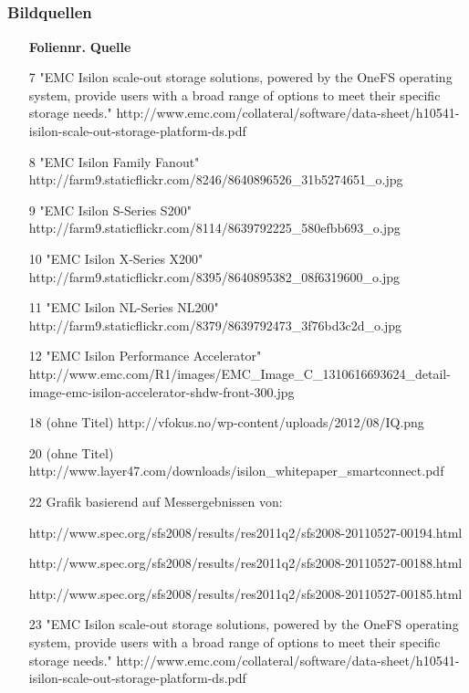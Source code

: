 \documentclass{beamer}
\begin{document}
\subsection{}
\begin{frame}[fragile]
  \frametitle{Bildquellen}

  \tiny
  \begin{itemize}
    \item[\textbf{Foliennr.}] \textbf{Quelle}
    \item[7] "EMC Isilon scale-out storage solutions, powered by the OneFS operating system, provide users with a broad range of options to meet their specific storage needs." http://www.emc.com/collateral/software/data-sheet/h10541-isilon-scale-out-storage-platform-ds.pdf
    \item[8] "EMC Isilon Family Fanout" http://farm9.staticflickr.com/8246/8640896526\_31b5274651\_o.jpg
    \item[9] "EMC Isilon S-Series S200" http://farm9.staticflickr.com/8114/8639792225\_580efbb693\_o.jpg
    \item[10] "EMC Isilon X-Series X200" http://farm9.staticflickr.com/8395/8640895382\_08f6319600\_o.jpg
    \item[11] "EMC Isilon NL-Series NL200" http://farm9.staticflickr.com/8379/8639792473\_3f76bd3c2d\_o.jpg 
    \item[12] "EMC Isilon Performance Accelerator" http://www.emc.com/R1/images/EMC\_Image\_C\_1310616693624\_detail-image-emc-isilon-accelerator-shdw-front-300.jpg
    \item[18] (ohne Titel) http://vfokus.no/wp-content/uploads/2012/08/IQ.png
    \item[20] (ohne Titel) http://www.layer47.com/downloads/isilon\_whitepaper\_smartconnect.pdf
    \item[22] Grafik basierend auf Messergebnissen von:
    \item[] http://www.spec.org/sfs2008/results/res2011q2/sfs2008-20110527-00194.html
    \item[] http://www.spec.org/sfs2008/results/res2011q2/sfs2008-20110527-00188.html
    \item[] http://www.spec.org/sfs2008/results/res2011q2/sfs2008-20110527-00185.html
    \item[23] "EMC Isilon scale-out storage solutions, powered by the OneFS operating system, provide users with a broad range of options to meet their specific storage needs." http://www.emc.com/collateral/software/data-sheet/h10541-isilon-scale-out-storage-platform-ds.pdf 
  \end{itemize}
  
\end{frame}
\end{document}
